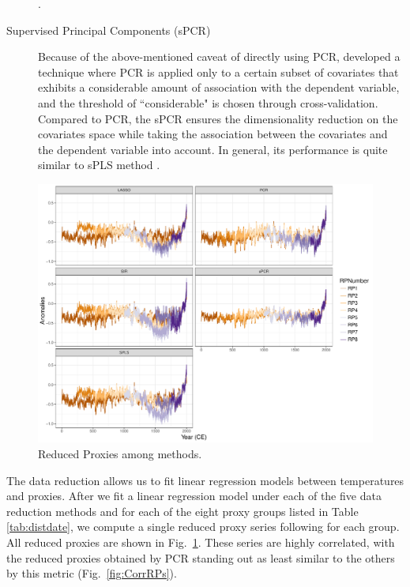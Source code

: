 \documentclass[12pt]{amsart}
\theoremstyle{plain}
\theoremstyle{definition}
\theoremstyle{remark}
\begin{document}
\begin{description}
\citep{Jolliffe1982,Tibshirani1996}. 
\item[Supervised Principal Components (sPCR)]
Because of the above-mentioned caveat of directly using PCR, \cite{Bair2006} developed a technique where PCR is applied only
to a certain subset of covariates that exhibits a considerable amount of association
 with the dependent variable, and the threshold of ``considerable" is chosen through
cross-validation. Compared to PCR, the sPCR ensures the dimensionality
reduction on the covariates space while taking the association between
the covariates and the dependent variable into account. In general, its performance is quite similar to
sPLS method \citep{Chung2013}.  
\end{description}

\begin{figure}
  \centering
 \includegraphics[scale=0.55]{RPs_type} 
  \caption{Reduced Proxies among methods.}
  \label{fig:RPs}
\end{figure}

The data reduction allows us to fit linear regression models between
temperatures and proxies. After we fit a linear regression model under each of
the five data reduction methods and for each of the eight proxy groups listed in
Table \ref{tab:distdate}, we compute a single reduced proxy series following
\cite{Barboza2014} for each group. All reduced proxies are shown in Fig.~\ref{fig:RPs}.  These series are highly correlated, with the reduced proxies obtained by PCR standing out as least similar to the others by this metric (Fig.~\ref{fig:CorrRPs}).
\end{document}
